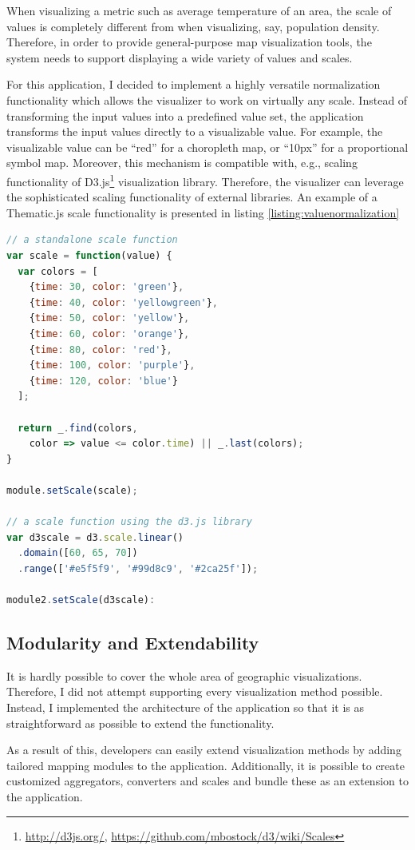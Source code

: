 When visualizing a metric such as average temperature of an area, the scale of values is completely different from when visualizing, say, population density. Therefore, in order to provide general-purpose map visualization tools, the system needs to support displaying a wide variety of values and scales.

For this application, I decided to implement a highly versatile normalization functionality which allows the visualizer to work on virtually any scale. Instead of transforming the input values into a predefined value set, the application transforms the input values directly to a visualizable value. For example, the visualizable value can be ``red'' for a choropleth map, or ``10px'' for a proportional symbol map. Moreover, this mechanism is compatible with, e.g., scaling functionality of D3.js\footnote{\url{http://d3js.org/}, \url{https://github.com/mbostock/d3/wiki/Scales}} visualization library. Therefore, the visualizer can leverage the sophisticated scaling functionality of external libraries. An example of a Thematic.js scale functionality is presented in listing \ref{listing:valuenormalization}

\begin{lstlisting}[caption=An example of Thematic.js scale functionality.,language=JavaScript,label=listing:valuenormalization]
// a standalone scale function
var scale = function(value) {
  var colors = [
    {time: 30, color: 'green'},
    {time: 40, color: 'yellowgreen'},
    {time: 50, color: 'yellow'},
    {time: 60, color: 'orange'},
    {time: 80, color: 'red'},
    {time: 100, color: 'purple'},
    {time: 120, color: 'blue'}
  ];

  return _.find(colors, 
    color => value <= color.time) || _.last(colors);
}

module.setScale(scale);

// a scale function using the d3.js library
var d3scale = d3.scale.linear()
  .domain([60, 65, 70])
  .range(['#e5f5f9', '#99d8c9', '#2ca25f']);

module2.setScale(d3scale):
\end{lstlisting}

\subsection{Modularity and Extendability}

It is hardly possible to cover the whole area of geographic visualizations. Therefore, I did not attempt supporting every visualization method possible. Instead, I implemented the architecture of the application so that it is as straightforward as possible to extend the functionality.

As a result of this, developers can easily extend visualization methods by adding tailored mapping modules to the application. Additionally, it is possible to create customized aggregators, converters and scales and bundle these as an extension to the application.
